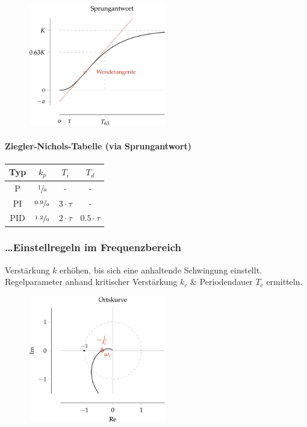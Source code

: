 \documentclass[
  10pt,
  a4paper,
  twocolumn]{article}
\let\oldparagraph\paragraph
\renewcommand{\paragraph}[1]{\oldparagraph{#1}\mbox{}}
\numberwithin{equation}{section}
\let\paragraph\oldparagraph
\renewcommand{\paragraph}[1]{\oldparagraph{#1}\mbox{}\par}
\begin{document}
\begin{figure}[H]

{\centering \includegraphics[width=6cm,height=\textheight]{images/paste-25.png}

}

\end{figure}

\hypertarget{ziegler-nichols-tabelle-via-sprungantwort}{%
\paragraph{Ziegler-Nichols-Tabelle (via
Sprungantwort)}\label{ziegler-nichols-tabelle-via-sprungantwort}}

\begin{longtable}[]{@{}cccc@{}}
\toprule\noalign{}
Typ & \(k_p\) & \(T_i\) & \(T_d\) \\
\midrule\noalign{}
\endhead
\bottomrule\noalign{}
\endlastfoot
P & \(\sfrac{1}{a}\) & - & - \\
PI & \(\sfrac{0.9}{a}\) & \(3\cdot\tau\) & - \\
PID & \(\sfrac{1.2}{a}\) & \(2\cdot\tau\) & \(0.5\cdot\tau\) \\
\end{longtable}

\hypertarget{einstellregeln-im-frequenzbereich}{%
\subsubsection{\ldots Einstellregeln im
Frequenzbereich}\label{einstellregeln-im-frequenzbereich}}

Verstärkung \(k\) erhöhen, bis sich eine anhaltende Schwingung
einstellt. Regelparameter anhand kritischer Verstärkung \(k_c\) \&
Periodendauer \(T_c\) ermitteln.

\begin{figure}[H]

{\centering \includegraphics[width=6cm,height=\textheight]{images/paste-26.png}

}

\end{figure}
\end{document}
